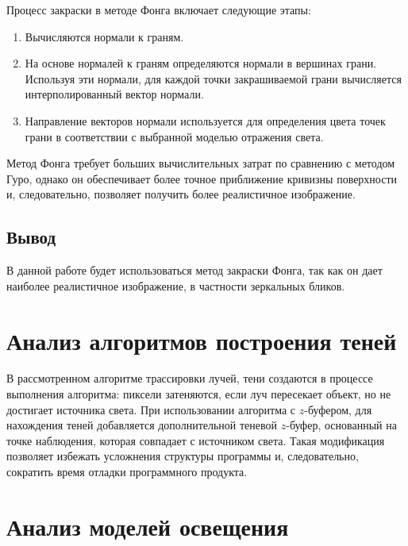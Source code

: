 Процесс закраски в методе Фонга включает следующие этапы:
\begin{enumerate}[label=\arabic*)]
	\item Вычисляются нормали к граням.
	\item На основе нормалей к граням определяются нормали в вершинах грани. Используя эти нормали, для каждой точки закрашиваемой грани вычисляется интерполированный вектор нормали.
	\item Направление векторов нормали используется для определения цвета точек грани в соответствии с выбранной моделью отражения света.
\end{enumerate}

Метод Фонга требует больших вычислительных затрат по сравнению с методом Гуро, однако он обеспечивает более точное приближение кривизны поверхности и, следовательно, позволяет получить более реалистичное изображение.

\subsection*{Вывод}

В данной работе будет использоваться метод закраски Фонга, так как он дает наиболее реалистичное изображение, в частности зеркальных бликов.

\section{Анализ алгоритмов построения теней}

В рассмотренном алгоритме трассировки лучей, тени создаются в процессе выполнения алгоритма: пиксели затеняются, если луч пересекает объект, но не достигает источника света. 
При использовании алгоритма с $z$-буфером, для нахождения теней добавляется дополнительной теневой $z$-буфер, основанный на точке наблюдения, которая совпадает с источником света. Такая модификация позволяет избежать усложнения структуры программы и, следовательно, сократить время отладки программного продукта.

\section{Анализ моделей освещения}

